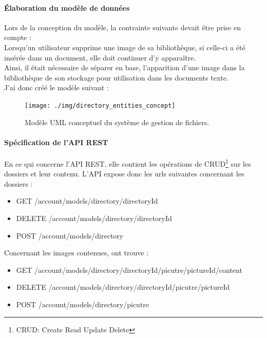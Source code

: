 \paragraph*{Élaboration du modèle de données\\}
Lors de la conception du modèle, la contrainte suivante devait être prise en compte : \\
Lorsqu'un utilisateur supprime une image de sa bibliothèque, si celle-ci a été insérée dans un document, elle doit continuer d'y apparaître. \\
Ainsi, il était nécessaire de séparer en base, l'apparition d'une image dans la bibliothèque de son stockage pour utilisation dans les documents texte. \\
J'ai donc créé le modèle suivant : 

\begin{figure}[H]
  \centering
  \texttt{[image: ./img/directory\_entities\_concept]}
  \caption{\label{fig:mb_va_ast} Modèle UML conceptuel du système de gestion de fichiers.}
\end{figure}

\paragraph*{Spécification de l'API REST\\}
En ce qui concerne l'API REST, elle contient les opérations de CRUD\footnote{CRUD: Create Read Update Delete} sur les dossiers et leur contenu.
L'API expose donc les urls suivantes concernant les dossiers : 
\begin{itemize}
\item GET /account/models/directory/{directoryId}
\item DELETE /account/models/directory/{directoryId}
\item POST /account/models/directory
\end{itemize}

Concernant les images contenues, ont trouve :
\begin{itemize}
\item GET /account/models/directory/{directoryId}/picutre/{pictureId}/content
\item DELETE /account/models/directory/{directoryId}/picutre/{pictureId}
\item POST /account/models/directory/picutre
\end{itemize}

